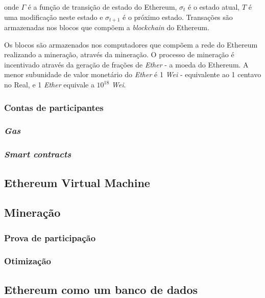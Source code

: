 \documentclass[tcc,capa]{texufpel}
\begin{document}
	    onde $\Gamma$ é a função de transição de estado do Ethereum, $\sigma_t$ é o estado atual, $T$ é uma modificação neste estado e $\sigma_{t+1}$ é o próximo estado. Transações são armazenadas nos blocos que compõem a \textit{blockchain} do Ethereum. 
	    
	    Os blocos são armazenados nos computadores que compõem a rede do Ethereum realizando a mineração, através da mineração. O processo de mineração é incentivado através da geração de frações de \textit{Ether} - a moeda do Ethereum. A menor subunidade de valor monetário do \textit{Ether} é 1 \textit{Wei} - equivalente ao 1 centavo no Real, e 1 \textit{Ether} equivale a $10^{18}$ \textit{Wei}.
	    
	    
    
    	\subsubsection{Contas de participantes}
    
    	\subsubsection{\textit{Gas}}
        
        \subsubsection{\textit{Smart contracts}}

	\subsection{Ethereum Virtual Machine}
    
    \subsection{Mineração}
    
    	\subsubsection{Prova de participação}
        
        \subsubsection{Otimização}
    
    \subsection{Ethereum como um banco de dados}
    
\end{document}
